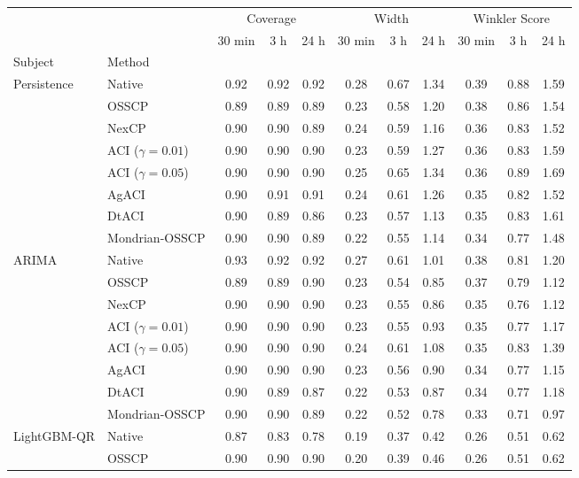 \begin{tabular}{@{}llccccccccc@{}}
\toprule
 &  & \multicolumn{3}{c}{Coverage} & \multicolumn{3}{c}{Width} & \multicolumn{3}{c}{Winkler Score} \\
 &  & 30 min & 3 h & 24 h & 30 min & 3 h & 24 h & 30 min & 3 h & 24 h \\
Subject & Method &  &  &  &  &  &  &  &  &  \\
\midrule
\multirow[t]{8}{*}{Persistence} & Native & 0.92 & 0.92 & 0.92 & 0.28 & 0.67 & 1.34 & 0.39 & 0.88 & 1.59 \\
 & OSSCP & 0.89 & 0.89 & 0.89 & 0.23 & 0.58 & 1.20 & 0.38 & 0.86 & 1.54 \\
 & NexCP & 0.90 & 0.90 & 0.89 & 0.24 & 0.59 & 1.16 & 0.36 & 0.83 & 1.52 \\
 & ACI ($\gamma=0.01$) & 0.90 & 0.90 & 0.90 & 0.23 & 0.59 & 1.27 & 0.36 & 0.83 & 1.59 \\
 & ACI ($\gamma=0.05$) & 0.90 & 0.90 & 0.90 & 0.25 & 0.65 & 1.34 & 0.36 & 0.89 & 1.69 \\
 & AgACI & 0.90 & 0.91 & 0.91 & 0.24 & 0.61 & 1.26 & 0.35 & 0.82 & 1.52 \\
 & DtACI & 0.90 & 0.89 & 0.86 & 0.23 & 0.57 & 1.13 & 0.35 & 0.83 & 1.61 \\
 & Mondrian-OSSCP & 0.90 & 0.90 & 0.89 & 0.22 & 0.55 & 1.14 & 0.34 & 0.77 & 1.48 \\
\cmidrule{1-11}
\multirow[t]{8}{*}{ARIMA} & Native & 0.93 & 0.92 & 0.92 & 0.27 & 0.61 & 1.01 & 0.38 & 0.81 & 1.20 \\
 & OSSCP & 0.89 & 0.89 & 0.90 & 0.23 & 0.54 & 0.85 & 0.37 & 0.79 & 1.12 \\
 & NexCP & 0.90 & 0.90 & 0.90 & 0.23 & 0.55 & 0.86 & 0.35 & 0.76 & 1.12 \\
 & ACI ($\gamma=0.01$) & 0.90 & 0.90 & 0.90 & 0.23 & 0.55 & 0.93 & 0.35 & 0.77 & 1.17 \\
 & ACI ($\gamma=0.05$) & 0.90 & 0.90 & 0.90 & 0.24 & 0.61 & 1.08 & 0.35 & 0.83 & 1.39 \\
 & AgACI & 0.90 & 0.90 & 0.90 & 0.23 & 0.56 & 0.90 & 0.34 & 0.77 & 1.15 \\
 & DtACI & 0.90 & 0.89 & 0.87 & 0.22 & 0.53 & 0.87 & 0.34 & 0.77 & 1.18 \\
 & Mondrian-OSSCP & 0.90 & 0.90 & 0.89 & 0.22 & 0.52 & 0.78 & 0.33 & 0.71 & 0.97 \\
\cmidrule{1-11}
\multirow[t]{8}{*}{LightGBM-QR} & Native & 0.87 & 0.83 & 0.78 & 0.19 & 0.37 & 0.42 & 0.26 & 0.51 & 0.62 \\
 & OSSCP & 0.90 & 0.90 & 0.90 & 0.20 & 0.39 & 0.46 & 0.26 & 0.51 & 0.62 \\

\end{tabular}
